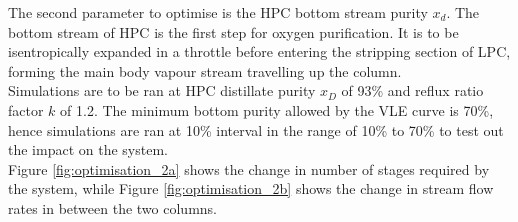     The second parameter to optimise is the HPC bottom stream purity $x_d$. The bottom stream of HPC is the first step for oxygen purification. It is to be isentropically expanded in a throttle before entering the stripping section of LPC, forming the main body vapour stream travelling up the column. \\
    Simulations are to be ran at HPC distillate purity $x_D$ of 93\% and reflux ratio factor $k$ of 1.2. The minimum bottom purity allowed by the VLE curve is 70\%, hence simulations are ran at 10\% interval in the range of 10\% to 70\% to test out the impact on the system. \\
    
    \noindent Figure \ref{fig:optimisation_2a} shows the change in number of stages required by the system, while Figure \ref{fig:optimisation_2b} shows the change in stream flow rates in between the two columns. \\
